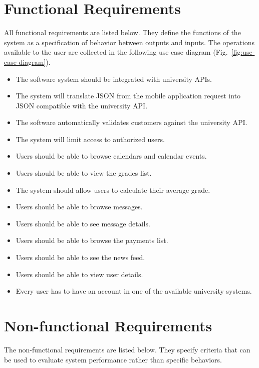\section{Functional Requirements}
All functional requirements are listed below. They define the functions of the system as a specification of behavior between outputs and inputs. The operations available to the user are collected in the following use case diagram (Fig.~\ref{fig:use-case-diagram}).

\begin{itemize}
    \item The software system should be integrated with university APIs.
    \item The system will translate JSON from the mobile application request into JSON compatible with the university API.
    \item The software automatically validates customers against the university API.
    \item The system will limit access to authorized users.
    \item Users should be able to browse calendars and calendar events.
    \item Users should be able to view the grades list.
    \item The system should allow users to calculate their average grade.
    \item Users should be able to browse messages.
    \item Users should be able to see message details.
    \item Users should be able to browse the payments list.
    \item Users should be able to see the news feed.
    \item Users should be able to view user details.
    \item Every user has to have an account in one of the available university systems.
\end{itemize}

\section{Non-functional Requirements}
The non-functional requirements are listed below. They specify criteria that can be used to evaluate system performance rather than specific behaviors.

